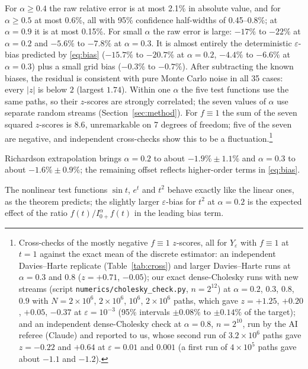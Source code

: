 \documentclass[11pt]{article}
\theoremstyle{remark}
\theoremstyle{definition}
\newcommand{\Ia}{I^{\alpha}_{0+}}
\begin{document}
For $\alpha\ge0.4$ the raw relative error is at most 2.1\% in absolute value, and for $\alpha\ge0.5$ at most 0.6\%, all with 95\% confidence half-widths of 0.45--0.8\%; at $\alpha=0.9$ it is at most 0.15\%. For small $\alpha$ the raw error is large: $-17\%$ to $-22\%$ at $\alpha=0.2$ and $-5.6\%$ to $-7.8\%$ at $\alpha=0.3$. It is almost entirely the deterministic $\varepsilon$-bias predicted by \eqref{eq:bias} ($-15.7\%$ to $-20.7\%$ at $\alpha=0.2$, $-4.4\%$ to $-6.6\%$ at $\alpha=0.3$) plus a small grid bias ($-0.3\%$ to $-0.7\%$). After subtracting the known biases, the residual is consistent with pure Monte Carlo noise in all 35 cases: every $|z|$ is below $2$ (largest $1.74$). Within one $\alpha$ the five test functions use the same paths, so their $z$-scores are strongly correlated; the seven values of $\alpha$ use separate random streams (Section~\ref{sec:method}). For $f\equiv1$ the sum of the seven squared $z$-scores is $8.6$, unremarkable on 7 degrees of freedom; five of the seven are negative, and independent cross-checks show this to be a fluctuation.\footnote{Cross-checks of the mostly negative $f\equiv1$ $z$-scores, all for $Y_\varepsilon$ with $f\equiv1$ at $t=1$ against the exact mean of the discrete estimator: an independent Davies--Harte replicate (Table~\ref{tab:cross}) and larger Davies--Harte runs at $\alpha=0.3$ and $0.8$ ($z=+0.71$, $-0.05$); our exact dense-Cholesky runs with new streams (script \texttt{numerics/cholesky\_check.py}, $n=2^{12}$) at $\alpha=0.2$, $0.3$, $0.8$, $0.9$ with $N=2\times10^6$, $2\times10^6$, $10^6$, $2\times10^6$ paths, which gave $z=+1.25$, $+0.20$, $+0.05$, $-0.37$ at $\varepsilon=10^{-3}$ (95\% intervals $\pm0.08\%$ to $\pm0.14\%$ of the target); and an independent dense-Cholesky check at $\alpha=0.8$, $n=2^{10}$, run by the AI referee (Claude) and reported to us, whose second run of $3.2\times10^6$ paths gave $z=-0.22$ and $+0.64$ at $\varepsilon=0.01$ and $0.001$ (a first run of $4\times10^5$ paths gave about $-1.1$ and $-1.2$).}

Richardson extrapolation brings $\alpha=0.2$ to about $-1.9\%\pm1.1\%$ and $\alpha=0.3$ to about $-1.6\%\pm0.9\%$; the remaining offset reflects higher-order terms in \eqref{eq:bias}.

The nonlinear test functions $\sin t$, $e^t$ and $t^2$ behave exactly like the linear ones, as the theorem predicts; the slightly larger $\varepsilon$-bias for $t^2$ at $\alpha=0.2$ is the expected effect of the ratio $f(t)/\Ia f(t)$ in the leading bias term.
\end{document}
